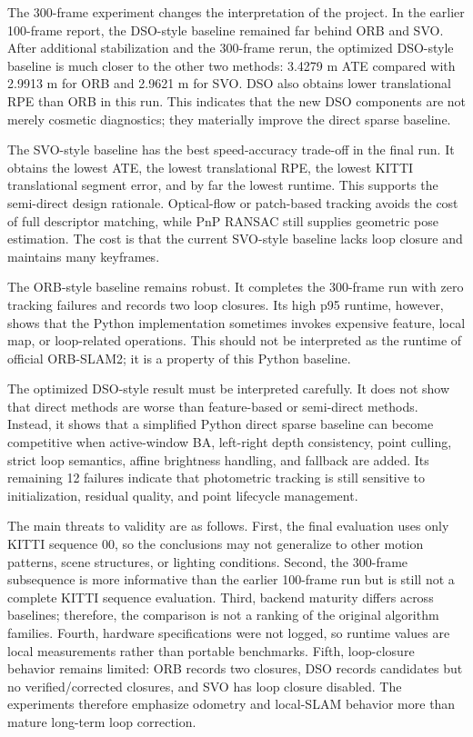 \documentclass[11pt,a4paper]{article}
\begin{document}
The 300-frame experiment changes the interpretation of the project. In the earlier 100-frame report, the DSO-style baseline remained far behind ORB and SVO. After additional stabilization and the 300-frame rerun, the optimized DSO-style baseline is much closer to the other two methods: 3.4279 m ATE compared with 2.9913 m for ORB and 2.9621 m for SVO. DSO also obtains lower translational RPE than ORB in this run. This indicates that the new DSO components are not merely cosmetic diagnostics; they materially improve the direct sparse baseline.

The SVO-style baseline has the best speed-accuracy trade-off in the final run. It obtains the lowest ATE, the lowest translational RPE, the lowest KITTI translational segment error, and by far the lowest runtime. This supports the semi-direct design rationale. Optical-flow or patch-based tracking avoids the cost of full descriptor matching, while PnP RANSAC still supplies geometric pose estimation. The cost is that the current SVO-style baseline lacks loop closure and maintains many keyframes.

The ORB-style baseline remains robust. It completes the 300-frame run with zero tracking failures and records two loop closures. Its high p95 runtime, however, shows that the Python implementation sometimes invokes expensive feature, local map, or loop-related operations. This should not be interpreted as the runtime of official ORB-SLAM2; it is a property of this Python baseline.

The optimized DSO-style result must be interpreted carefully. It does not show that direct methods are worse than feature-based or semi-direct methods. Instead, it shows that a simplified Python direct sparse baseline can become competitive when active-window BA, left-right depth consistency, point culling, strict loop semantics, affine brightness handling, and fallback are added. Its remaining 12 failures indicate that photometric tracking is still sensitive to initialization, residual quality, and point lifecycle management.

The main threats to validity are as follows. First, the final evaluation uses only KITTI sequence 00, so the conclusions may not generalize to other motion patterns, scene structures, or lighting conditions. Second, the 300-frame subsequence is more informative than the earlier 100-frame run but is still not a complete KITTI sequence evaluation. Third, backend maturity differs across baselines; therefore, the comparison is not a ranking of the original algorithm families. Fourth, hardware specifications were not logged, so runtime values are local measurements rather than portable benchmarks. Fifth, loop-closure behavior remains limited: ORB records two closures, DSO records candidates but no verified/corrected closures, and SVO has loop closure disabled. The experiments therefore emphasize odometry and local-SLAM behavior more than mature long-term loop correction.
\end{document}
